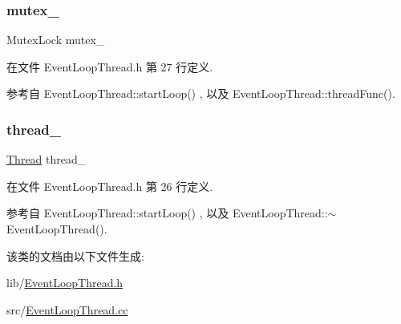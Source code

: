\subsubsection{\texorpdfstring{mutex\+\_\+}{mutex\_}}
{\footnotesize\ttfamily Mutex\+Lock mutex\+\_\+\hspace{0.3cm}{\ttfamily [private]}}



在文件 Event\+Loop\+Thread.\+h 第 27 行定义.



参考自 Event\+Loop\+Thread\+::start\+Loop() , 以及 Event\+Loop\+Thread\+::thread\+Func().

\mbox{\label{classmuduo_1_1EventLoopThread_ad920b8087250a686bfa5a9805170974a}} 
\subsubsection{\texorpdfstring{thread\+\_\+}{thread\_}}
{\footnotesize\ttfamily \hyperlink{classmuduo_1_1Thread}{Thread} thread\+\_\+\hspace{0.3cm}{\ttfamily [private]}}



在文件 Event\+Loop\+Thread.\+h 第 26 行定义.



参考自 Event\+Loop\+Thread\+::start\+Loop() , 以及 Event\+Loop\+Thread\+::$\sim$\+Event\+Loop\+Thread().



该类的文档由以下文件生成\+:\begin{DoxyCompactItemize}
\item 
lib/\hyperlink{EventLoopThread_8h}{Event\+Loop\+Thread.\+h}\item 
src/\hyperlink{EventLoopThread_8cc}{Event\+Loop\+Thread.\+cc}\end{DoxyCompactItemize}
